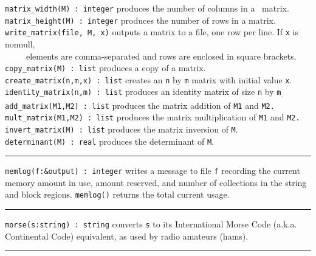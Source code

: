 \texttt{matrix\_width(M) : integer} produces the number of columns in a
\ matrix.\\
\texttt{matrix\_height(M) : integer} produces the number of rows in a
matrix.\\
\texttt{write\_matrix(file, M, x)} outputs a matrix to a file, one row
per line. If \texttt{x} is nonnull,\\
 \ \ \ \ \ elements are comma-separated and rows are enclosed
in square brackets.\\
\texttt{copy\_matrix(M) : list} produces a copy of a matrix.\\
\texttt{create\_matrix(n,m,x) : list} creates an \texttt{n} by
\texttt{m} matrix with initial value \texttt{x}.\\
\texttt{identity\_matrix(n,m) : list} produces an identity matrix of
size \texttt{n} by \texttt{m}\textsubscript{.}\\
\texttt{add\_matrix(M1,M2) : list} produces the matrix addition of
\texttt{M1} and \texttt{M2.}\\
\texttt{mult\_matrix(M1,M2) : list} produces the matrix multiplication
of \texttt{M1} and \texttt{M2.}\\
\texttt{invert\_matrix(M) : list} produces the matrix inversion of
\texttt{M}.\\
\texttt{determinant(M) : real} produces the determinant of \texttt{M}.


\vspace{0.25cm}\hrule{}

\texttt{memlog(f:\&output) : integer} writes a message to file
\texttt{f} recording the current memory amount in use, amount
reserved, and number of collections in the string and block regions.
\texttt{memlog()} returns the total current usage.

\vspace{0.25cm}\hrule{}

\texttt{morse(s:string) : string} converts \texttt{s} to its
International Morse Code (a.k.a. Continental Code)
equivalent, as used by radio amateurs (hams).

\vspace{0.25cm}\hrule{}

